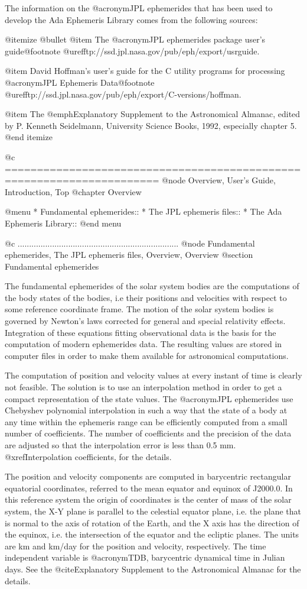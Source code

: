 The information on the @acronym{JPL} ephemerides that has been used to
develop the Ada Ephemeris Library comes from the following sources:

@itemize @bullet
@item The @acronym{JPL} ephemerides package user's guide@footnote{
@uref{ftp://ssd.jpl.nasa.gov/pub/eph/export/usrguide}}.

@item David Hoffman's user's guide for the C utility programs for
processing @acronym{JPL} Ephemeris Data@footnote{
@uref{ftp://ssd.jpl.nasa.gov/pub/eph/export/C-versions/hoffman}}.

@item The @emph{Explanatory Supplement to the Astronomical Almanac},
edited by P. Kenneth Seidelmann, University Science Books, 1992,
especially chapter 5.
@end itemize

@c ======================================================================
@node Overview, User's Guide, Introduction, Top
@chapter Overview

@menu
* Fundamental ephemerides::     
* The JPL ephemeris files::     
* The Ada Ephemeris Library::   
@end menu


@c ......................................................................
@node Fundamental ephemerides, The JPL ephemeris files, Overview, Overview
@section Fundamental ephemerides

The fundamental ephemerides of the solar system bodies are the
computations of the body states of the bodies, i.e their positions and
velocities with respect to some reference coordinate frame.  The
motion of the solar system bodies is governed by Newton's laws
corrected for general and special relativity effects. Integration of
these equations fitting observational data is the basis for the
computation of modern ephemerides data. The resulting values are
stored in computer files in order to make them available for
astronomical computations.

The computation of position and velocity values at every instant of
time is clearly not feasible. The solution is to use an interpolation
method in order to get a compact representation of the state
values. The @acronym{JPL} ephemerides use Chebyshev polynomial
interpolation in such a way that the state of a body at any time
within the ephemeris range can be efficiently computed from a small
number of coefficients. The number of coefficients and the precision
of the data are adjusted so that the interpolation error is less than
0.5 mm. @xref{Interpolation coefficients}, for the details.

The position and velocity components are computed in barycentric
rectangular equatorial coordinates, referred to the mean equator and
equinox of J2000.0. In this reference system the origin of coordinates
is the center of mass of the solar system, the X-Y plane is parallel
to the celestial equator plane, i.e. the plane that is normal to the
axis of rotation of the Earth, and the X axis has the direction of the
equinox, i.e. the intersection of the equator and the ecliptic planes.
The units are km and km/day for the position and velocity,
respectively.  The time independent variable is @acronym{TDB,
barycentric dynamical time} in Julian days.  See the @cite{Explanatory
Supplement to the Astronomical Almanac} for the details.


